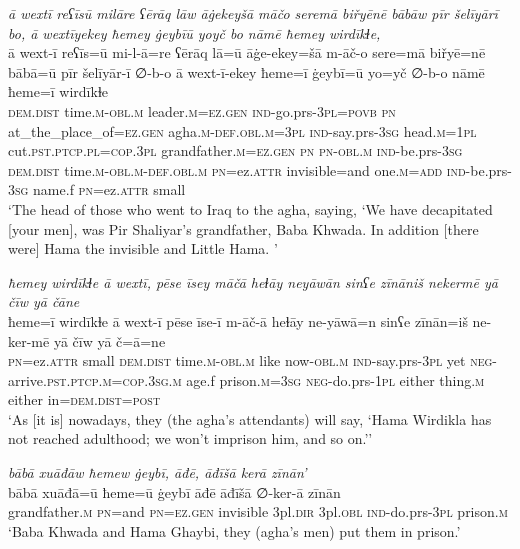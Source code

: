 \ea \label{BP.122}
\textit{ā wextī reʕīsū milāre ʕērāq lāw āġekeyšā māčo seremā biřyēnē bābāw pīr šelīyārī bo, ā wextīyekey ħemey ġeybīū yoyč bo nāmē ħemey wirdīkɫe,} \\ 
\gll ā wext-ī reʕīs=ū mi-l-ā=re ʕērāq lā=ū āġe-ekey=šā m-āč-o sere=mā biřyē=nē bābā=ū pīr šelīyār-ī ∅-b-o ā wext-ī-ekey ħeme=ī ġeybī=ū yo=yč ∅-b-o nāmē ħeme=ī wirdīkɫe \\ 
 \textsc{dem.dist} time\textsc{.m}\textsc{-obl}\textsc{.m} leader\textsc{.m}\textsc{=ez.gen} \textsc{ind-}go.prs\textsc{-3pl}\textsc{=\textsc{povb}} \textsc{pn} at\_the\_place\_of\textsc{=ez.gen} agha\textsc{.m}\textsc{-def}\textsc{.obl}\textsc{.m}\textsc{=3pl} \textsc{ind-}say.prs\textsc{-3sg} head\textsc{.m}\textsc{=\textsc{1pl}} cut\textsc{.pst}\textsc{.ptcp}\textsc{.pl}\textsc{=cop}\textsc{.3pl} grandfather\textsc{.m}\textsc{=ez.gen} \textsc{pn} \textsc{pn}\textsc{-obl}\textsc{.m} \textsc{ind-}be.prs\textsc{-3sg} \textsc{dem.dist} time\textsc{.m}\textsc{-obl}\textsc{.m}\textsc{-def}\textsc{.obl}\textsc{.m} \textsc{pn}=ez.\textsc{attr} invisible=and one\textsc{.m}\textsc{=add} \textsc{ind-}be.prs\textsc{-3sg} name.f \textsc{pn}=ez.\textsc{attr} small \\ 
\glt `The head of those who went to Iraq to the agha, saying, ‘We have decapitated [your men], was Pir Shaliyar’s grandfather, Baba Khwada. In addition [there were] Hama the invisible and Little Hama. '
\z 
 
\ea \label{BP.123}
\textit{ħemey wirdīkɫe ā wextī, pēse īsey māčā heɫāy neyāwān sinʕe zīnāniš nekermē yā čīw yā čāne} \\ 
\gll ħeme=ī wirdīkɫe ā wext-ī pēse īse-ī m-āč-ā heɫāy ne-yāwā=n sinʕe zīnān=iš ne-ker-mē yā čīw yā č=ā=ne \\ 
 \textsc{pn}=ez.\textsc{attr} small \textsc{dem.dist} time\textsc{.m}\textsc{-obl}\textsc{.m} like now\textsc{-obl}\textsc{.m} \textsc{ind-}say.prs\textsc{-3pl} yet \textsc{neg-}arrive\textsc{.pst}\textsc{.ptcp}\textsc{.m}\textsc{=cop}\textsc{.3sg}\textsc{.m} age.f prison\textsc{.m}\textsc{=3sg} \textsc{neg-}do.prs\textsc{-\textsc{1pl}} either thing\textsc{.m} either in=\textsc{dem.dist}\textsc{=\textsc{post}} \\ 
\glt `As [it is] nowadays, they (the agha’s attendants) will say, ‘Hama Wirdikla has not reached adulthood; we won’t imprison him, and so on.’'
\z 
 
\ea \label{BP.131}
\textit{bābā xuāđāw ħemew ġeybī, āđē, āđīšā kerā zīnān’} \\ 
\gll bābā xuāđā=ū ħeme=ū ġeybī āđē āđīšā ∅-ker-ā zīnān \\ 
 grandfather\textsc{.m} \textsc{pn}=and \textsc{pn}\textsc{=ez.gen} invisible 3pl\textsc{.dir} 3pl\textsc{.obl} \textsc{ind-}do.prs\textsc{-3pl} prison\textsc{.m} \\ 
\glt `Baba Khwada and Hama Ghaybi, they (agha’s men) put them  in prison.'
\z 
 
